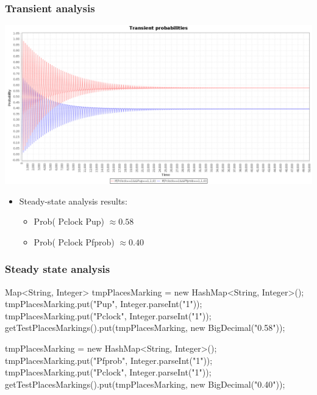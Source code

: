 \begin{frame}
  \frametitle{Transient analysis}
  \begin{center}
    \includegraphics[width=\textwidth]{img/rejuvenationTrans.png}    
  \end{center}
  \pause
  \begin{itemize}
  	\item Steady-state analysis results:
  	\pause
  	\begin{itemize}
  		\item Prob({\color{red} Pclock Pup}) $\approx 0.58$
  		\item Prob({\color{blue} Pclock Pfprob}) $\approx 0.40$
  	\end{itemize}
  \end{itemize}
\end{frame}

\begin{frame}[fragile]
  \frametitle{Steady state analysis}
  \footnotesize
  \begin{jblock}
Map<String, Integer> tmpPlacesMarking = new HashMap<String, Integer>();
tmpPlacesMarking.put("Pup", Integer.parseInt("1"));
tmpPlacesMarking.put("Pclock", Integer.parseInt("1"));
getTestPlacesMarkings().put(tmpPlacesMarking, new BigDecimal("0.58"));

tmpPlacesMarking = new HashMap<String, Integer>();
tmpPlacesMarking.put("Pfprob", Integer.parseInt("1"));
tmpPlacesMarking.put("Pclock", Integer.parseInt("1"));
getTestPlacesMarkings().put(tmpPlacesMarking, new BigDecimal("0.40"));
  \end{jblock}
  \pause
  \begin{center}
  \end{center}
\end{frame}


